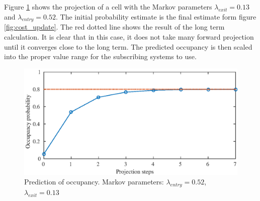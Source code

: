 Figure \ref{fig:cost_predict} shows the projection of a cell with the Markov parameters \(\lambda_{exit} = 0.13 \) and \(\lambda_{entry} = 0.52 \). The initial probability estimate is the final estimate form figure \ref{fig:cost_update}. The red dotted line shows the result of the long term calculation. It is clear that in this case, it does not take many forward projection until it converges close to the long term. The predicted occupancy is then scaled into the proper value range for the subscribing systems to use. 

\begin{figure}[htbp]
	\centering
	\includegraphics[width=1\linewidth]{chapters/cost_interpretation/figures/projection}
	\caption{Prediction of occupancy. Markov parameters: \(\lambda_{entry} = 0.52\), \(\lambda_{exit} = 0.13\)}
	\label{fig:cost_predict}
\end{figure}